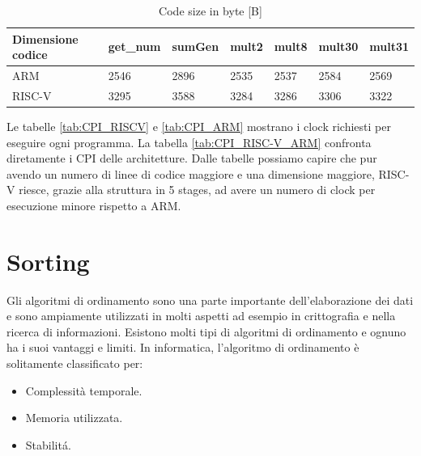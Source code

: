 \documentclass[12pt, a4paper]{report}
\begin{document}
\begin{table}[h]
\centering
\begin{tabular}{|l|l|l|l|l|l|l|}
\hline
Dimensione codice & get\_num & sumGen & mult2 & mult8 & mult30 & mult31 \\ \hline
ARM           & 2546     & 2896   & 2535  & 2537  & 2584   & 2569   \\ \hline
RISC-V               & 3295     & 3588   & 3284  & 3286  & 3306   & 3322   \\ \hline
\end{tabular}
\caption{Code size in byte [B]}
\end{table}

Le tabelle \ref{tab:CPI_RISCV} e \ref{tab:CPI_ARM} mostrano i clock richiesti per eseguire ogni programma. La tabella \ref{tab:CPI_RISC-V_ARM} confronta diretamente i CPI delle architetture. Dalle tabelle possiamo capire che pur avendo un numero di linee di codice maggiore e una dimensione maggiore, RISC-V riesce, grazie alla struttura in 5 stages, ad avere un numero di clock per esecuzione minore rispetto a ARM. %





\newpage
\section{Sorting}
Gli algoritmi di ordinamento sono una parte importante dell'elaborazione dei dati e sono ampiamente utilizzati in molti aspetti ad esempio in crittografia e nella ricerca di informazioni. Esistono molti tipi di algoritmi di ordinamento e ognuno ha i suoi vantaggi e limiti. In informatica, l'algoritmo di ordinamento è solitamente classificato per:

\begin{itemize}
	\item Complessità temporale. %
	\item Memoria utilizzata.
	\item Stabilit\'a.%
\end{itemize}
\end{document}

